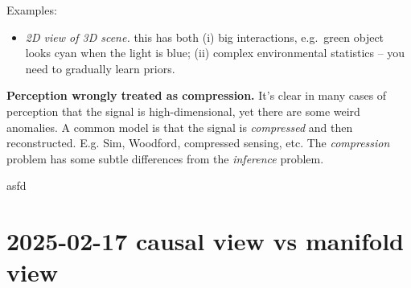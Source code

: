 \documentclass[
  10pt,
  letterpaper,
  DIV=11,
  numbers=noendperiod,
  oneside]{scrartcl}
\providecommand{\tightlist}{%
  \setlength{\itemsep}{0pt}\setlength{\parskip}{0pt}}\usepackage{longtable,booktabs,array}
\begin{document}
Examples:

\begin{itemize}
\tightlist
\item
  \emph{2D view of 3D scene.} this has both (i) big interactions,
  e.g.~green object looks cyan when the light is blue; (ii) complex
  environmental statistics -- you need to gradually learn priors.
\end{itemize}

\textbf{Perception wrongly treated as compression.} It's clear in many
cases of perception that the signal is high-dimensional, yet there are
some weird anomalies. A common model is that the signal is
\emph{compressed} and then reconstructed. E.g. Sim, Woodford, compressed
sensing, etc. The \emph{compression} problem has some subtle differences
from the \emph{inference} problem.

\begin{description}
\tightlist
\item[Could call the states ``noumena'' and the signals ``phenomena''.]
asfd
\end{description}

\section{2025-02-17 \textbar{} causal view vs manifold
view}\label{causal-view-vs-manifold-view}
\end{document}
